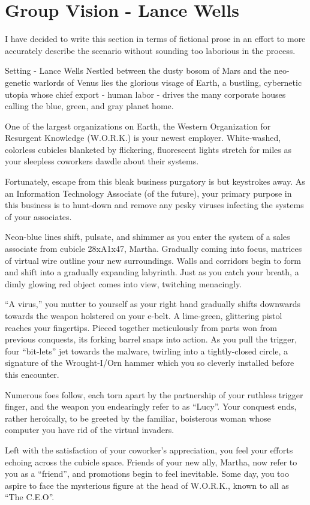 \documentclass[12pt]{report}
\begin{document}
\chapter{Group Vision - Lance Wells}

I have decided to write this section in terms of fictional prose in an 
effort to more accurately describe the scenario without sounding too
laborious in the process.

\begin{section}{Setting - Lance Wells}
Nestled between the dusty bosom of Mars and the neo-genetic warlords of
Venus lies the glorious visage of Earth, a bustling, cybernetic utopia whose
chief export - human labor - drives the many corporate houses calling the
blue, green, and gray planet home.

One of the largest organizations on Earth, the Western Organization for
Resurgent Knowledge (W.O.R.K.) is your newest employer. White-washed,
colorless cubicles blanketed by flickering, fluorescent lights stretch for
miles as your sleepless coworkers dawdle about their systems.

Fortunately, escape from this bleak business purgatory is but keystrokes
away. As an Information Technology Associate (of the future), your primary
purpose in this business is to hunt-down and remove any pesky viruses
infecting the systems of your associates.

Neon-blue lines shift, pulsate, and shimmer as you enter the system of a
sales associate from cubicle 28xA1x47, Martha. Gradually coming into focus,
matrices of virtual wire outline your new surroundings. Walls and corridors
begin to form and shift into a gradually expanding labyrinth. Just as you
catch your breath, a dimly glowing red object comes into view, twitching
menacingly.

``A virus,'' you mutter to yourself as your right hand gradually shifts
downwards towards the weapon holstered on your e-belt. A lime-green,
glittering pistol reaches your fingertips. Pieced together meticulously from
parts won from previous conquests, its forking barrel snaps into action. As
you pull the trigger, four ``bit-lets'' jet towards the malware, twirling
into a tightly-closed circle, a signature of the Wrought-I/Orn hammer which
you so cleverly installed before this encounter.

Numerous foes follow, each torn apart by the partnership of your ruthless
trigger finger, and the weapon you endearingly refer to as ``Lucy''. Your
conquest ends, rather heroically, to be greeted by the familiar, boisterous
woman whose computer you have rid of the virtual invaders.

Left with the satisfaction of your coworker's appreciation, you feel your
efforts echoing across the cubicle space. Friends of your new ally, Martha,
now refer to you as a ``friend'', and promotions begin to feel inevitable.
Some day, you too aspire to face the mysterious figure at the head of
W.O.R.K., known to all as ``The C.E.O''.
\end{section}
\end{document}
